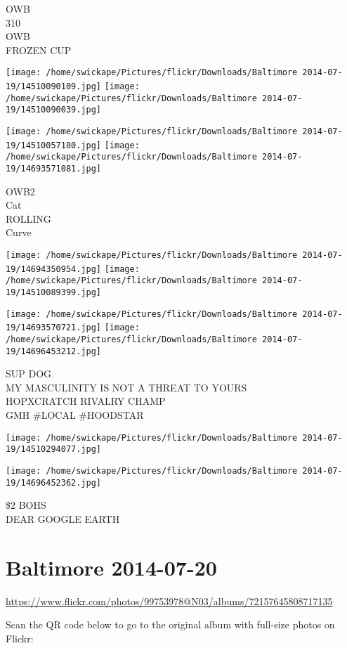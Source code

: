 \documentclass[10pt,letterpaper]{article}
\begin{document}
OWB\\
310\\
OWB\\
FROZEN CUP
\pagebreak

\texttt{[image: /home/swickape/Pictures/flickr/Downloads/Baltimore 2014-07-19/14510090109.jpg]}
\texttt{[image: /home/swickape/Pictures/flickr/Downloads/Baltimore 2014-07-19/14510090039.jpg]}

\texttt{[image: /home/swickape/Pictures/flickr/Downloads/Baltimore 2014-07-19/14510057180.jpg]}
\texttt{[image: /home/swickape/Pictures/flickr/Downloads/Baltimore 2014-07-19/14693571081.jpg]}

OWB2\\
Cat\\
ROLLING\\
Curve
\pagebreak

\texttt{[image: /home/swickape/Pictures/flickr/Downloads/Baltimore 2014-07-19/14694350954.jpg]}
\texttt{[image: /home/swickape/Pictures/flickr/Downloads/Baltimore 2014-07-19/14510089399.jpg]}

\texttt{[image: /home/swickape/Pictures/flickr/Downloads/Baltimore 2014-07-19/14693570721.jpg]}
\texttt{[image: /home/swickape/Pictures/flickr/Downloads/Baltimore 2014-07-19/14696453212.jpg]}

SUP DOG\\
MY MASCULINITY IS NOT A THREAT TO YOURS\\
HOPXCRATCH RIVALRY CHAMP\\
GMH \#LOCAL \#HOODSTAR
\pagebreak

\texttt{[image: /home/swickape/Pictures/flickr/Downloads/Baltimore 2014-07-19/14510294077.jpg]}

\vspace{0.25in}
\texttt{[image: /home/swickape/Pictures/flickr/Downloads/Baltimore 2014-07-19/14696452362.jpg]}

\$2 BOHS\\
DEAR GOOGLE EARTH
\pagebreak

\section*{Baltimore 2014-07-20}

\url{https://www.flickr.com/photos/99753978@N03/albums/72157645808717135}

Scan the QR code below to go to the original album with full-size photos on Flickr:
\end{document}
